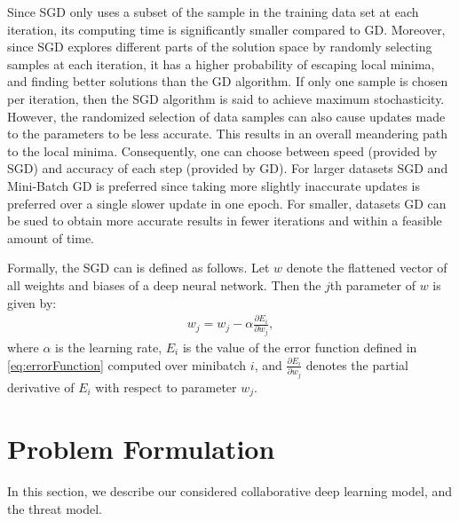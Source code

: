 \documentclass[conference]{IEEEtran}
\begin{document}
Since SGD only uses a subset of the sample in the training data set at each iteration, its computing time is
significantly smaller compared to GD.  Moreover, since SGD explores different parts of the solution space by randomly selecting samples
at each iteration, it has a higher probability of escaping local minima, and finding better solutions than the GD algorithm. 
If only one sample is chosen per iteration, then the SGD algorithm is said to achieve maximum
stochasticity. However,
the randomized selection of data samples can also cause updates made to the parameters to be less accurate. This results in an overall
meandering path to the local minima. Consequently, one can choose between speed (provided by SGD) and accuracy of each step (provided by
GD). For larger datasets SGD and Mini-Batch GD is preferred since taking more slightly inaccurate updates is preferred over a
single slower update in one epoch. For smaller, datasets GD can be sued to obtain more accurate results in fewer iterations and within
a feasible amount of time. 


Formally, the SGD can is defined as follows.  Let $w$ denote the flattened vector of all weights and biases of a deep neural
network. 
Then the $j$th parameter of $w$ is given by:
\begin{align}\label{eq:SGD}
w_j = w_j -\alpha \frac{\partial E_i}{\partial w_j}, 
\end{align}
where $\alpha$ is the learning rate,  $E_i$ is the value of the error function defined in \ref{eq:errorFunction} computed over
minibatch $i$, and  $\frac{\partial E_i}{\partial w_j}$ denotes the partial derivative of $E_i$ with respect to parameter $w_j$. 
 

\section{Problem Formulation}
In this section, we describe our considered collaborative deep learning model, and the threat model. 
\end{document}
